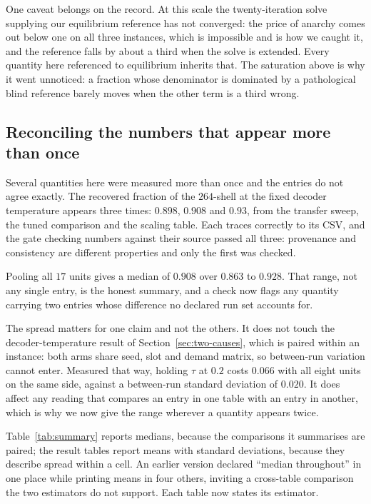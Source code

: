 \documentclass[journal]{IEEEtran}
\begin{document}
One caveat belongs on the record. At this scale the twenty-iteration solve supplying our
equilibrium reference has not converged: the price of anarchy comes out below one on all three
instances, which is impossible and is how we caught it, and the reference falls by about a third
when the solve is extended. Every quantity here referenced to equilibrium inherits that. The
saturation above is why it went unnoticed: a fraction whose denominator is dominated by a
pathological blind reference barely moves when the other term is a third wrong.

\subsection{Reconciling the numbers that appear more than once}\label{sec:pooled}
Several quantities here were measured more than once and the entries do not agree exactly. The
recovered fraction of the $264$-shell at the fixed decoder temperature appears three times:
$0.898$, $0.908$ and $0.93$, from the transfer sweep, the tuned comparison and the scaling table.
Each traces correctly to its CSV, and the gate checking numbers against their source passed all
three: provenance and consistency are different properties and only the first was checked.

Pooling all $17$ units gives a median of $0.908$ over $0.863$ to $0.928$. That range, not any single entry, is the honest summary, and a check now flags any quantity carrying two entries whose difference no declared run set accounts for.

The spread matters for one claim and not the others. It does not touch the decoder-temperature result of Section~\ref{sec:two-causes}, which is paired within an instance: both arms share seed, slot and demand matrix, so between-run variation cannot enter. Measured that way, holding $\tau$ at $0.2$ costs $0.066$ with all eight units on the same side, against a between-run standard deviation of $0.020$. It does affect any reading that compares an entry in one table with an entry in another,
which is why we now give the range wherever a quantity appears twice.

Table~\ref{tab:summary} reports medians, because the comparisons it summarises are paired; the
result tables report means with standard deviations, because they describe spread within a cell. An
earlier version declared ``median throughout'' in one place while printing means in four others,
inviting a cross-table comparison the two estimators do not support. Each table now states its
estimator.
\end{document}
